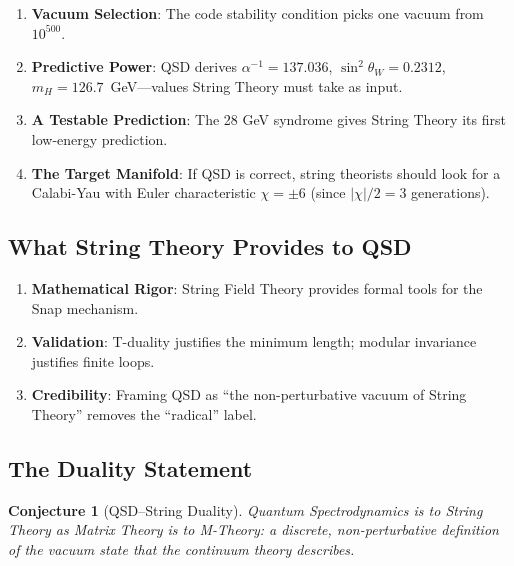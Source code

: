\documentclass[11pt,a4paper]{article}
\newtheorem{conjecture}[theorem]{Conjecture}
\theoremstyle{definition}
\begin{document}
\begin{enumerate}
    \item \textbf{Vacuum Selection}: The code stability condition picks one vacuum from $10^{500}$.
    
    \item \textbf{Predictive Power}: QSD derives $\alpha^{-1} = 137.036$, $\sin^2\theta_W = 0.2312$, $m_H = 126.7$~GeV---values String Theory must take as input.
    
    \item \textbf{A Testable Prediction}: The 28 GeV syndrome gives String Theory its first low-energy prediction.
    
    \item \textbf{The Target Manifold}: If QSD is correct, string theorists should look for a Calabi-Yau with Euler characteristic $\chi = \pm 6$ (since $|\chi|/2 = 3$ generations).
\end{enumerate}

\subsection{What String Theory Provides to QSD}

\begin{enumerate}
    \item \textbf{Mathematical Rigor}: String Field Theory provides formal tools for the Snap mechanism.
    
    \item \textbf{Validation}: T-duality justifies the minimum length; modular invariance justifies finite loops.
    
    \item \textbf{Credibility}: Framing QSD as ``the non-perturbative vacuum of String Theory'' removes the ``radical'' label.
\end{enumerate}

\subsection{The Duality Statement}

\begin{conjecture}[QSD--String Duality]
Quantum Spectrodynamics is to String Theory as Matrix Theory is to M-Theory: a discrete, non-perturbative definition of the vacuum state that the continuum theory describes.
\end{conjecture}

\end{document}
